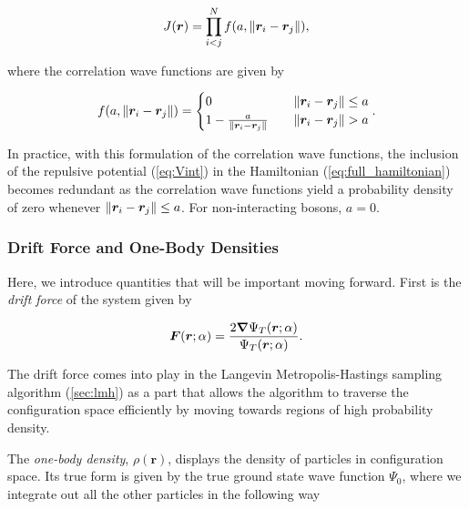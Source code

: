 \begin{equation}\label{eq:jastrow_factor}
    J \qty(\bm{r}) = \prod_{i<j}^N f \qty(a, \norm{\bm{r}_i - \bm{r}_j}),
\end{equation}

where the correlation wave functions are given by

\begin{equation}\label{eq:corr_wf}
    f \qty(a, \norm{\bm{r}_i - \bm{r}_j}) = 
    \begin{cases}
        0 \quad &\norm{\bm{r}_i - \bm{r}_j} \leq a
        \\
        1 - \frac{a}{\norm{\bm{r}_i - \bm{r}_j}} \quad &\norm{\bm{r}_i - \bm{r}_j} > a
    \end{cases}.
\end{equation}

In practice, with this formulation of the correlation wave functions, the inclusion of the repulsive potential (\autoref{eq:Vint}) in the Hamiltonian (\autoref{eq:full_hamiltonian}) becomes redundant as the correlation wave functions yield a probability density of zero whenever $\norm{\bm{r}_i - \bm{r}_j} \leq a$. For non-interacting bosons, $a=0$. 


\subsubsection{Drift Force and One-Body Densities}

Here, we introduce quantities that will be important moving forward. First is the \textit{drift force} of the system given by

\begin{equation}\label{eq:drift_force}
    \bm{F} \qty(\bm{r}; \alpha) = \frac{2 \grad \Psi_T \qty(\bm{r}; \alpha)}{\Psi_T \qty(\bm{r}; \alpha)}.
\end{equation}

The drift force comes into play in the Langevin Metropolis-Hastings sampling algorithm (\autoref{sec:lmh}) as a part that allows the algorithm to traverse the configuration space efficiently by moving towards regions of high probability density.


The \textit{one-body density}, $\rho(\bm{r})$, displays the density of particles in configuration space. Its true form is given by the true ground state wave function $\Psi_0$, where we integrate out all the other particles in the following way

